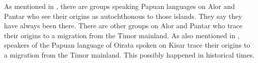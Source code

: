 As mentioned in ,
there are groups speaking Papuan languages on Alor
and Pantar who see their origins as autochthonous to those islands.
They say they have always been there.
There are other groups on Alor
and Pantar who trace their origins to a migration from the Timor mainland.
As also mentioned in ,
speakers of the Papuan language of Oirata spoken on Kisar trace
their origins to a migration from the Timor mainland.
This possibly happened in historical times.